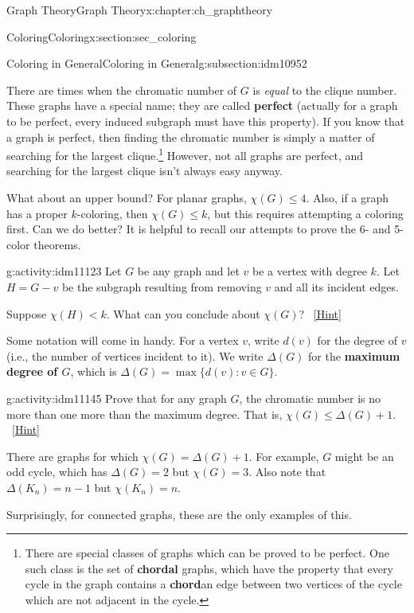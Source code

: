\documentclass[oneside,10pt,]{book}
\newcommand{\terminology}[1]{\textbf{#1}}
\numberwithin{equation}{chapter}
\def\st{:}
\newcommand{\lt}{<}
\begin{document}
\begin{chapterptx}{Graph Theory}{}{Graph Theory}{}{}{x:chapter:ch_graphtheory}
\begin{sectionptx}{Coloring}{}{Coloring}{}{}{x:section:sec_coloring}
\begin{subsectionptx}{Coloring in General}{}{Coloring in General}{}{}{g:subsection:idm10952}
\par
There are times when the chromatic number of \(G\) is \emph{equal} to the clique number. These graphs have a special name; they are called \terminology{perfect} (actually for a graph to be perfect, every induced subgraph must have this property). If you know that a graph is perfect, then finding the chromatic number is simply a matter of searching for the largest clique.\footnote{There are special classes of graphs which can be proved to be perfect.  One such class is the set of \terminology{chordal} graphs, which have the property that every cycle in the graph contains a \terminology{chord}\textemdash{}an edge between two vertices of the cycle which are not adjacent in the cycle.\label{g:fn:idm11115}} However, not all graphs are perfect, and searching for the largest clique isn't always easy anyway.%
\par
What about an upper bound?  For planar graphs, \(\chi(G) \le 4\).  Also, if a graph has a proper \(k\)-coloring, then \(\chi(G) \le k\), but this requires attempting a coloring first.  Can we do better? It is helpful to recall our attempts to prove the 6- and 5-color theorems.%
\begin{activity}{}{g:activity:idm11123}%
Let \(G\) be any graph and let \(v\) be a vertex with degree \(k\).  Let \(H = G - v\) be the subgraph resulting from removing \(v\) and all its incident edges.%
\par
Suppose \(\chi(H) \lt k\).  What can you conclude about \(\chi(G)\)?%
\qquad~\hfill{\tiny\hyperlink{g:hint:idm11134-back}{[Hint]}}\end{activity}
Some notation will come in handy.  For a vertex \(v\), write \(d(v)\) for the degree of \(v\) (i.e., the number of vertices incident to it).  We write \(\Delta(G)\) for the \terminology{maximum degree of \(G\)}, which is \(\Delta(G) = \max\{d(v) \st v \in G\}\).%
\begin{activity}{}{g:activity:idm11145}%
Prove that for any graph \(G\), the chromatic number is no more than one more than the maximum degree.  That is, \(\chi(G) \le \Delta(G) + 1\).%
\qquad~\hfill{\tiny\hyperlink{g:hint:idm11150-back}{[Hint]}}\end{activity}
There are graphs for which \(\chi(G) = \Delta(G) + 1\).  For example, \(G\) might be an odd cycle, which has \(\Delta(G) = 2\) but \(\chi(G) = 3\).  Also note that \(\Delta(K_n) = n-1\) but \(\chi(K_n) = n\).%
\par
Surprisingly, for connected graphs, these are the only examples of this.%

\end{subsectionptx}
\end{sectionptx}
\end{chapterptx}
\end{document}
